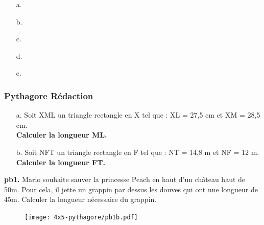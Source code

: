 \begin{multicols}{5}
  \begin{enumerate}
  \item[a.] \dotfill \\ \Pointilles[1]
  \item[b.] \dotfill \\ \Pointilles[1]
  \item[c.] \dotfill \\ \Pointilles[1]
  \item[d.] \dotfill \\ \Pointilles[1]
  \item[e.] \dotfill \\ \Pointilles[1]
  \end{enumerate}
\end{multicols}

\subsubsection*{Pythagore Rédaction}

\begin{multicols}{2}
\begin{enumerate}
  \item[a.]Soit XML un triangle rectangle en X tel que : XL = 27,5 cm et XM = 28,5 cm. \\
  \textbf{Calculer la longueur ML.}

  \item[b.]Soit NFT un triangle rectangle en F tel que : NT = 14,8 m et NF = 12 m. \\
  \textbf{Calculer la longueur FT.}

\end{enumerate}
\end{multicols}

\Pointilles[13]

\begin{minipage}[t]{0.65\textwidth}
  \textbf{pb1.} Mario souhaite sauver la princesse Peach en haut d'un château haut de 50m. Pour cela, il jette un grappin par dessus les douves qui ont une longueur de 45m. Calculer la longueur nécessaire du grappin.
  
  \Pointilles[5]
  \end{minipage}
  \begin{minipage}[t]{0.35\textwidth}
  \begin{figure}[H]
    \centering
    \texttt{[image: 4x5-pythagore/pb1b.pdf]}
  \end{figure}
\end{minipage}

